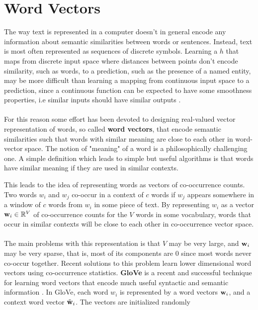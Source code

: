 \section{Word Vectors}
The way text is represented in a computer doesn't in general encode any information about semantic similarities between words or sentences. Instead, text is most often represented as sequences of discrete symbols. Learning a $h$ that maps from discrete input space where distances between points don't encode similarity, such as words, to a prediction, such as the presence of a named entity, may be more difficult than learning a mapping from continuous input space to a prediction, since a continuous function can be expected to have some smoothness properties, i.e similar inputs should have similar outputs \citep{bengio2003}.
\\\\
For this reason some effort has been devoted to designing real-valued vector representation of words, so called \textbf{word vectors}, that encode semantic similarities such that words with similar meaning are close to each other in word-vector space. The notion of "meaning" of a word is a philosophically challenging one. A simple definition which leads to simple but useful algorithms is that words have similar meaning if they are used in similar contexts.

This leads to the idea of representing words as vectors of co-occurrence counts. Two words $w_i$ and $w_j$ co-occur in a context of $c$ words if $w_j$ appears somewhere in a window of $c$ words from $w_i$ in some piece of text. By representing $w_i$ as a vector $\mathbf{w}_i \in \mathbb{R}^V$ of co-occurrence counts for the $V$ words in some vocabulary, words that occur in similar contexts will be close to each other in co-occurrence vector space.
\\\\
The main problems with this representation is that $V$ may be very large, and $\mathbf{w}_i$ may be very sparse, that is, most of its components are 0 since most words never co-occur together. Recent solutions to this problem learn lower dimensional word vectors using co-occurrence statistics. \textbf{GloVe} is a recent and successful technique for learning word vectors that encode much useful syntactic and semantic information \citep{pennington2014}. In GloVe, each word $w_i$ is represented by a word vectors $\mathbf{w}_i$, and a context word vector $\tilde{\mathbf{w}}_i$. The vectors are initialized randomly

